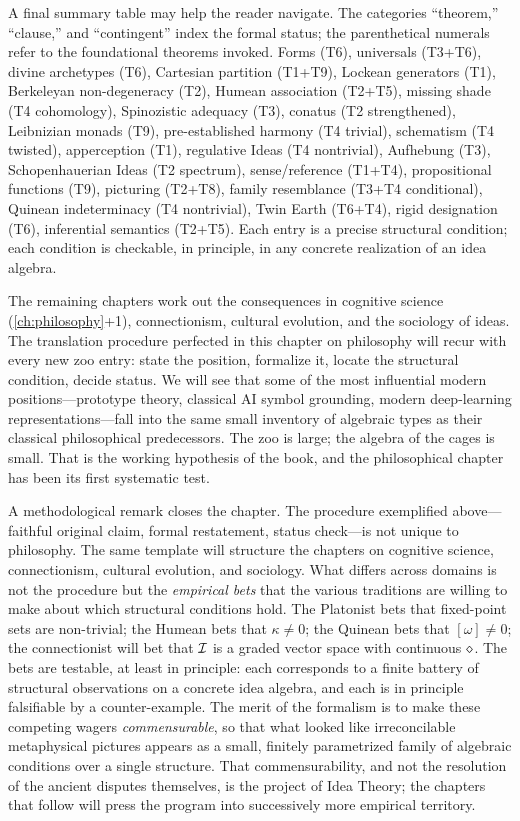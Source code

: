 A final summary table may help the reader navigate. The categories
``theorem,'' ``clause,'' and ``contingent'' index the formal status;
the parenthetical numerals refer to the foundational theorems invoked.
Forms (T6), universals (T3+T6), divine archetypes (T6), Cartesian
partition (T1+T9), Lockean generators (T1), Berkeleyan non-degeneracy
(T2), Humean association (T2+T5), missing shade (T4 cohomology),
Spinozistic adequacy (T3), conatus (T2 strengthened), Leibnizian
monads (T9), pre-established harmony (T4 trivial), schematism (T4
twisted), apperception (T1), regulative Ideas (T4 nontrivial),
Aufhebung (T3), Schopenhauerian Ideas (T2 spectrum), sense/reference
(T1+T4), propositional functions (T9), picturing (T2+T8), family
resemblance (T3+T4 conditional), Quinean indeterminacy (T4 nontrivial),
Twin Earth (T6+T4), rigid designation (T6), inferential semantics
(T2+T5). Each entry is a precise structural condition; each condition
is checkable, in principle, in any concrete realization of an idea
algebra.

The remaining chapters work out the consequences in cognitive science
(\cref{ch:philosophy}+1), connectionism, cultural evolution, and the
sociology of ideas. The translation procedure perfected in this
chapter on philosophy will recur with every new zoo entry: state the
position, formalize it, locate the structural condition, decide
status. We will see that some of the most influential modern
positions---prototype theory, classical AI symbol grounding, modern
deep-learning representations---fall into the same small inventory of
algebraic types as their classical philosophical predecessors. The
zoo is large; the algebra of the cages is small. That is the working
hypothesis of the book, and the philosophical chapter has been its
first systematic test.

A methodological remark closes the chapter. The procedure exemplified
above---faithful original claim, formal restatement, status check---is
not unique to philosophy. The same template will structure the
chapters on cognitive science, connectionism, cultural evolution, and
sociology. What differs across domains is not the procedure but the
\emph{empirical bets} that the various traditions are willing to
make about which structural conditions hold. The Platonist bets that
fixed-point sets are non-trivial; the Humean bets that $\kappa\neq 0$;
the Quinean bets that $[\omega]\neq 0$; the connectionist will bet
that $\mathcal{I}$ is a graded vector space with continuous $\mathbin{\diamond}$.
The bets are testable, at least in principle: each corresponds to a
finite battery of structural observations on a concrete idea algebra,
and each is in principle falsifiable by a counter-example. The merit
of the formalism is to make these competing wagers \emph{commensurable},
so that what looked like irreconcilable metaphysical pictures appears
as a small, finitely parametrized family of algebraic conditions over
a single structure. That commensurability, and not the resolution of
the ancient disputes themselves, is the project of Idea Theory; the
chapters that follow will press the program into successively more
empirical territory.

